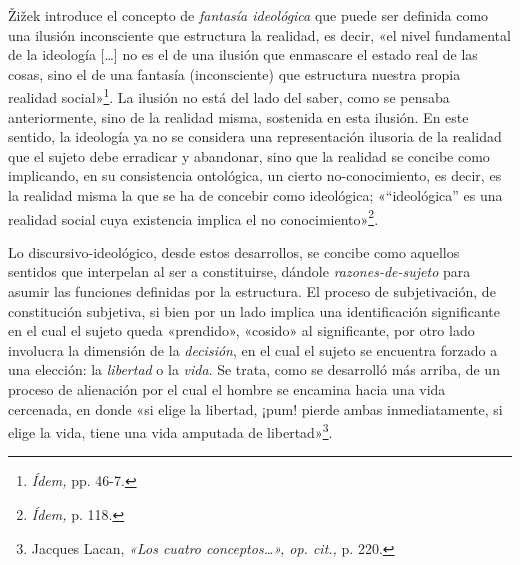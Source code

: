 Žižek introduce el concepto de \emph{fantasía ideológica} que puede ser definida como una ilusión inconsciente que estructura la realidad, es decir, «el nivel fundamental de la ideología {[}\ldots{]} no es el de una ilusión que enmascare el estado real de las cosas, sino el de una fantasía (inconsciente) que estructura nuestra propia realidad social»\footnote{\emph{Ídem,} pp. 46-7.}. La ilusión no está del lado del saber, como se pensaba anteriormente, sino de la realidad misma, sostenida en esta ilusión. En este sentido, la ideología ya no se considera una representación ilusoria de la realidad que el sujeto debe erradicar y abandonar, sino que la realidad se concibe como implicando, en su consistencia ontológica, un cierto no-conocimiento, es decir, es la realidad misma la que se ha de concebir como ideológica; «``ideológica'' es una realidad social cuya existencia implica el no conocimiento»\footnote{\emph{Ídem,} p. 118.}.

Lo discursivo-ideológico, desde estos desarrollos, se concibe como aquellos sentidos que interpelan al ser a constituirse, dándole \emph{razones-de-sujeto} para asumir las funciones definidas por la estructura. El proceso de subjetivación, de constitución subjetiva, si bien por un lado implica una identificación significante en el cual el sujeto queda «prendido», «cosido» al significante, por otro lado involucra la dimensión de la \emph{decisión}, en el cual el sujeto se encuentra forzado a una elección: la \emph{libertad} o la \emph{vida}. Se trata, como se desarrolló más arriba, de un proceso de alienación por el cual el hombre se encamina hacia una vida cercenada, en donde «si elige la libertad, ¡pum! pierde ambas inmediatamente, si elige la vida, tiene una vida amputada de libertad»\footnote{Jacques Lacan, \emph{«Los cuatro conceptos\ldots», op. cit.,} p. 220.}.

